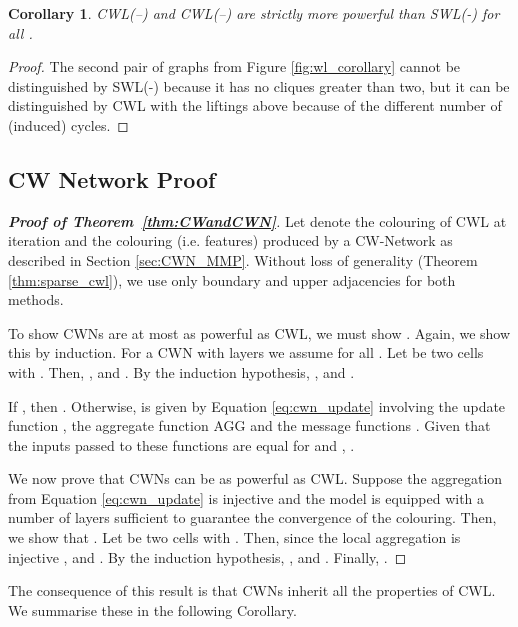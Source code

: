 \documentclass{article}
\newtheorem{corollary}[theorem]{Corollary}
\begin{document}
\begin{corollary}
\label{cor:cwl_better_than_swl}
CWL(--) and CWL(--) are strictly more powerful than SWL(-) for all . 
\end{corollary}

\begin{proof}
The second pair of graphs from Figure \ref{fig:wl_corollary} cannot be distinguished by SWL(-) because it has no cliques greater than two, but it can be distinguished by CWL with the liftings above because of the different number of (induced) cycles. 
\end{proof}

\subsection{CW Network Proof} 

\begin{proof}[\textbf{Proof of Theorem~\ref{thm:CWandCWN}}]
Let  denote the colouring of CWL at iteration  and  the colouring (i.e. features) produced by a CW-Network as described in Section \ref{sec:CWN_MMP}. Without loss of generality (Theorem \ref{thm:sparse_cwl}), we use only boundary and upper adjacencies for both methods. 

To show CWNs are at most as powerful as CWL, we must show . Again, we show this by induction. For a CWN with  layers we assume  for all .
Let  be two cells with . Then, ,  and . By the induction hypothesis, ,  and . 

If , then . Otherwise,  is given by Equation \ref{eq:cwn_update} involving the update function , the aggregate function AGG and the message functions . Given that the inputs passed to these functions are equal for  and , . 

We now prove that CWNs can be as powerful as CWL. Suppose the aggregation from Equation \ref{eq:cwn_update} is injective and the model is equipped with a number of layers  sufficient to guarantee the convergence of the  colouring. Then, we show that . 
Let  be two cells with . Then, since the local aggregation is injective ,  and . By the induction hypothesis, ,  and . Finally, .
\end{proof}

The consequence of this result is that CWNs inherit all the properties of CWL. We summarise these in the following Corollary. 
\end{document}
